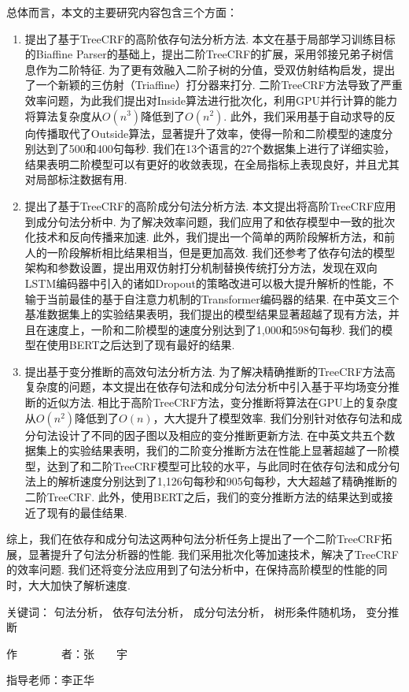 \begin{cabstract}
  总体而言，本文的主要研究内容包含三个方面：
  \begin{enumerate}
    \item 提出了基于TreeCRF的高阶依存句法分析方法.
          本文在基于局部学习训练目标的Biaffine Parser的基础上，提出二阶TreeCRF的扩展，采用邻接兄弟子树信息作为二阶特征.
          为了更有效融入二阶子树的分值，受双仿射结构启发，提出了一个新颖的三仿射（Triaffine）打分器来打分.
          二阶TreeCRF方法导致了严重效率问题，为此我们提出对Inside算法进行批次化，利用GPU并行计算的能力将算法复杂度从$O(n^3)$降低到了$O(n^2)$.
          此外，我们采用基于自动求导的反向传播取代了Outside算法，显著提升了效率，使得一阶和二阶模型的速度分别达到了500和400句每秒.
          我们在13个语言的27个数据集上进行了详细实验，结果表明二阶模型可以有更好的收敛表现，在全局指标上表现良好，并且尤其对局部标注数据有用.
    \item 提出了基于TreeCRF的高阶成分句法分析方法.
          本文提出将高阶TreeCRF应用到成分句法分析中.
          为了解决效率问题，我们应用了和依存模型中一致的批次化技术和反向传播来加速.
          此外，我们提出一个简单的两阶段解析方法，和前人的一阶段解析相比结果相当，但是更加高效.
          我们还参考了依存句法的模型架构和参数设置，提出用双仿射打分机制替换传统打分方法，发现在双向LSTM编码器中引入的诸如Dropout的策略改进可以极大提升解析的性能，不输于当前最佳的基于自注意力机制的Transformer编码器的结果.
          在中英文三个基准数据集上的实验结果表明，我们提出的模型结果显著超越了现有方法，并且在速度上，一阶和二阶模型的速度分别达到了1,000和598句每秒.
          我们的模型在使用BERT之后达到了现有最好的结果.
    \item 提出基于变分推断的高效句法分析方法.
          为了解决精确推断的TreeCRF方法高复杂度的问题，本文提出在依存句法和成分句法分析中引入基于平均场变分推断的近似方法.
          相比于高阶TreeCRF方法，变分推断将算法在GPU上的复杂度从$O(n^2)$降低到了$O(n)$，大大提升了模型效率.
          我们分别针对依存句法和成分句法设计了不同的因子图以及相应的变分推断更新方法.
          在中英文共五个数据集上的实验结果表明，我们的二阶变分推断方法在性能上显著超越了一阶模型，达到了和二阶TreeCRF模型可比较的水平，与此同时在依存句法和成分句法上的解析速度分别达到了1,126句每秒和905句每秒，大大超越了精确推断的二阶TreeCRF.
          此外，使用BERT之后，我们的变分推断方法的结果达到或接近了现有的最佳结果.
  \end{enumerate}

  综上，我们在依存和成分句法这两种句法分析任务上提出了一个二阶TreeCRF拓展，显著提升了句法分析器的性能.
  我们采用批次化等加速技术，解决了TreeCRF的效率问题.
  我们还将变分法应用到了句法分析中，在保持高阶模型的性能的同时，大大加快了解析速度.

  \vskip 21bp
    {\heiti{} 关键词：}
  句法分析，
  依存句法分析，
  成分句法分析，
  树形条件随机场，
  变分推断

  \begin{flushright}
    作~~~~~~~~者：张~~~~宇

    指导老师：李正华

  \end{flushright}
\end{cabstract}


